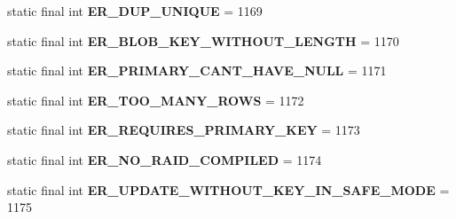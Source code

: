 \begin{DoxyCompactItemize}
\item 
\mbox{\label{classcom_1_1mysql_1_1jdbc_1_1_mysql_error_numbers_ac3b278c61b998ebe4d9f88a2a22b4ea2}} 
static final int {\bfseries E\+R\+\_\+\+D\+U\+P\+\_\+\+U\+N\+I\+Q\+UE} = 1169
\item 
\mbox{\label{classcom_1_1mysql_1_1jdbc_1_1_mysql_error_numbers_a42095abf8263627429fc1ab7c3d94ef5}} 
static final int {\bfseries E\+R\+\_\+\+B\+L\+O\+B\+\_\+\+K\+E\+Y\+\_\+\+W\+I\+T\+H\+O\+U\+T\+\_\+\+L\+E\+N\+G\+TH} = 1170
\item 
\mbox{\label{classcom_1_1mysql_1_1jdbc_1_1_mysql_error_numbers_a50f3f266c46f5eb15482fc51cd888ff5}} 
static final int {\bfseries E\+R\+\_\+\+P\+R\+I\+M\+A\+R\+Y\+\_\+\+C\+A\+N\+T\+\_\+\+H\+A\+V\+E\+\_\+\+N\+U\+LL} = 1171
\item 
\mbox{\label{classcom_1_1mysql_1_1jdbc_1_1_mysql_error_numbers_a4f95d0768a6e4532db3192ce525758c3}} 
static final int {\bfseries E\+R\+\_\+\+T\+O\+O\+\_\+\+M\+A\+N\+Y\+\_\+\+R\+O\+WS} = 1172
\item 
\mbox{\label{classcom_1_1mysql_1_1jdbc_1_1_mysql_error_numbers_a5e07a41f7dc507bcad66f5be548151a1}} 
static final int {\bfseries E\+R\+\_\+\+R\+E\+Q\+U\+I\+R\+E\+S\+\_\+\+P\+R\+I\+M\+A\+R\+Y\+\_\+\+K\+EY} = 1173
\item 
\mbox{\label{classcom_1_1mysql_1_1jdbc_1_1_mysql_error_numbers_a551d23d45d9b6660691457fc4f9db895}} 
static final int {\bfseries E\+R\+\_\+\+N\+O\+\_\+\+R\+A\+I\+D\+\_\+\+C\+O\+M\+P\+I\+L\+ED} = 1174
\item 
\mbox{\label{classcom_1_1mysql_1_1jdbc_1_1_mysql_error_numbers_a30280e9ce16b60c4063621345da01fd0}} 
static final int {\bfseries E\+R\+\_\+\+U\+P\+D\+A\+T\+E\+\_\+\+W\+I\+T\+H\+O\+U\+T\+\_\+\+K\+E\+Y\+\_\+\+I\+N\+\_\+\+S\+A\+F\+E\+\_\+\+M\+O\+DE} = 1175
\item 
\mbox{\label{classcom_1_1mysql_1_1jdbc_1_1_mysql_error_numbers_a508e0efc83e982d960e8a858ca819cbc}} 

\end{DoxyCompactItemize}
